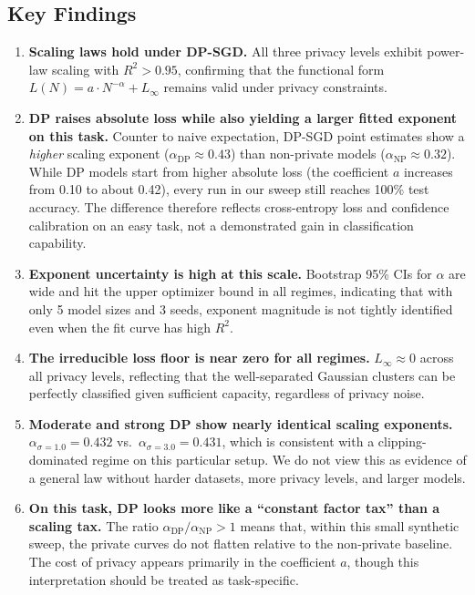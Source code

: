 \documentclass[11pt,a4paper]{article}
\begin{document}
\subsection{Key Findings}

\begin{enumerate}
  \item \textbf{Scaling laws hold under DP-SGD.} All three privacy levels exhibit power-law scaling with $R^2 > 0.95$, confirming that the functional form $L(N) = a \cdot N^{-\alpha} + L_\infty$ remains valid under privacy constraints.

  \item \textbf{DP raises absolute loss while also yielding a larger fitted exponent on this task.} Counter to naive expectation, DP-SGD point estimates show a \emph{higher} scaling exponent ($\alpha_{\text{DP}} \approx 0.43$) than non-private models ($\alpha_{\text{NP}} \approx 0.32$). While DP models start from higher absolute loss (the coefficient $a$ increases from 0.10 to about 0.42), every run in our sweep still reaches 100\% test accuracy. The difference therefore reflects cross-entropy loss and confidence calibration on an easy task, not a demonstrated gain in classification capability.

  \item \textbf{Exponent uncertainty is high at this scale.} Bootstrap 95\% CIs for $\alpha$ are wide and hit the upper optimizer bound in all regimes, indicating that with only 5 model sizes and 3 seeds, exponent magnitude is not tightly identified even when the fit curve has high $R^2$.

  \item \textbf{The irreducible loss floor is near zero for all regimes.} $L_\infty \approx 0$ across all privacy levels, reflecting that the well-separated Gaussian clusters can be perfectly classified given sufficient capacity, regardless of privacy noise.

  \item \textbf{Moderate and strong DP show nearly identical scaling exponents.} $\alpha_{\sigma=1.0} = 0.432$ vs.\ $\alpha_{\sigma=3.0} = 0.431$, which is consistent with a clipping-dominated regime on this particular setup. We do not view this as evidence of a general law without harder datasets, more privacy levels, and larger models.

  \item \textbf{On this task, DP looks more like a ``constant factor tax'' than a scaling tax.} The ratio $\alpha_{\text{DP}} / \alpha_{\text{NP}} > 1$ means that, within this small synthetic sweep, the private curves do not flatten relative to the non-private baseline. The cost of privacy appears primarily in the coefficient $a$, though this interpretation should be treated as task-specific.
\end{enumerate}
\end{document}
